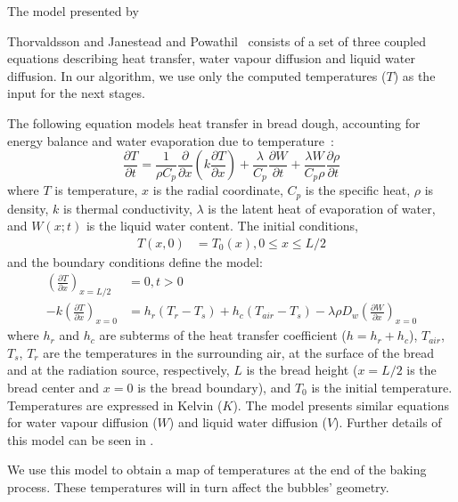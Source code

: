 \documentclass[final,5p,times]{elsarticle}
\begin{document}
The model presented by {Thorvaldsson and Janestead \cite{Thorvaldsson1999} and Powathil~\cite{Powathil2004} consists of a set of three coupled equations describing heat transfer, water vapour diffusion and liquid water diffusion. In our algorithm,  we use only the computed temperatures ($T$) as the input for the next stages. %

The following equation models heat transfer in bread dough, accounting for energy balance and water evaporation due to temperature~\cite{Thorvaldsson1999}:
%
\begin{equation}
\frac{\partial T}{\partial t} = \frac{1}{\rho C_{p}} \frac{\partial}{\partial x} \left ( k \frac{\partial T}{\partial x} \right ) + \frac{\lambda}{C_{p}} \frac{\partial W}{\partial t}+\frac{\lambda W}{ C_{p} \rho}\frac{\partial \rho}{\partial t}
\end{equation}
%
where $T$ is temperature, $x$ is the radial coordinate, $C_{p}$ is the specific heat, $\rho$ is density, $k$ is thermal conductivity, $\lambda$ is the latent heat of evaporation of water, and $W(x;t)$ is the liquid water content. The initial conditions,
%
\begin{align}
T(x,0) &= T_{0}(x), 0\le x \le L/2
\end{align}
and the boundary conditions define the model:
\begin{align}
\left ( \frac{\partial T}{\partial x} \right )_{x=L/2} &= 0 , t > 0 \\
-k \left ( \frac{\partial T}{\partial x} \right )_{x=0} &= h_{r}(T_{r}-T_{s}) + h_{c}(T_{air}-T_{s}) - \lambda \rho D_{w} \left (\frac{\partial W}{\partial x} \right )_{x=0}
\end{align}
%
where $h_{r}$ and $h_{c}$ are subterms of the heat transfer coefficient ($h = h_{r}+h_{c}$), $T_{air}$, $T_{s}$, $T_{r}$ are the temperatures in the surrounding air, at the surface of the bread and at the radiation source, respectively, $L$ is the bread height ($x = L/2$ is the bread center and $x = 0$ is the bread boundary), and $T_{0}$ is the initial temperature. Temperatures are expressed in Kelvin ($K$). The model presents similar equations for water vapour diffusion ($W$) and  liquid water diffusion ($V$). Further details of this model can be seen in \cite{Thorvaldsson1999}.

We use this model to obtain a map of temperatures at the end of the baking process. These temperatures will in turn affect the bubbles' geometry.

}
\end{document}
